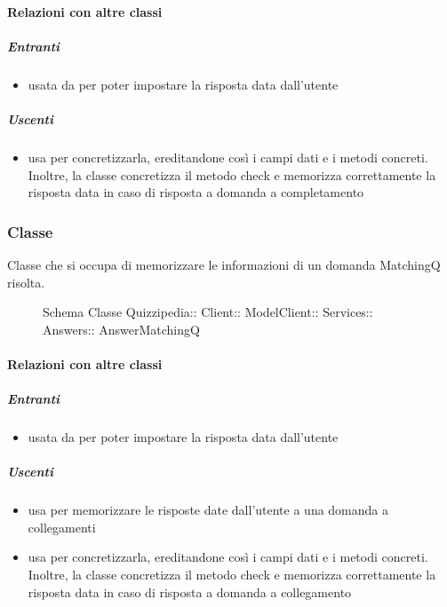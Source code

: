 \paragraph{Relazioni con altre classi}
\subparagraph{Entranti}
\begin{itemize}
\item usata da  per poter impostare la risposta data dall'utente
\end{itemize}
\subparagraph{Uscenti}
\begin{itemize}
\item usa  per concretizzarla, ereditandone così i campi dati e i metodi concreti. Inoltre, la classe concretizza il metodo check e memorizza correttamente la risposta data in caso di risposta a domanda a completamento
\end{itemize}
\subsubsection{Classe }
Classe che si occupa di memorizzare le informazioni di un domanda MatchingQ risolta.
\begin{figure}[H]
\centering
\noindent{}
\caption[Schema Classe AnswerMatchingQ]{Schema Classe Quizzipedia:: Client:: ModelClient:: Services:: Answers:: AnswerMatchingQ}
\end{figure}
\paragraph{Relazioni con altre classi}
\subparagraph{Entranti}
\begin{itemize}
\item usata da  per poter impostare la risposta data dall'utente
\end{itemize}
\subparagraph{Uscenti}
\begin{itemize}
\item usa  per memorizzare le risposte date dall'utente a una domanda a collegamenti
\item usa  per concretizzarla, ereditandone così i campi dati e i metodi concreti. Inoltre, la classe concretizza il metodo check e memorizza correttamente la risposta data in caso di risposta a domanda a collegamento
\end{itemize}

